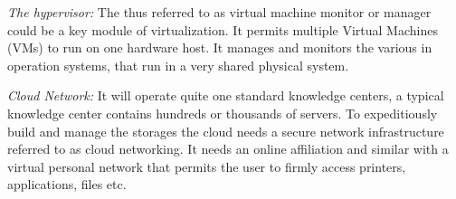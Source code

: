  \textit{The hypervisor:} The thus referred to as virtual machine monitor or manager could be a key module of virtualization. It permits multiple Virtual Machines (VMs) to run on one hardware host. It manages and monitors the various in operation systems, that run in a very shared physical system.
 
 \textit{Cloud Network:} It will operate quite one standard knowledge centers, a typical knowledge center contains hundreds or thousands of servers. To expeditiously build and manage the storages the cloud needs a secure network infrastructure referred to as cloud networking. It needs an online affiliation and similar with a virtual personal network that permits the user to firmly access printers, applications, files etc.






